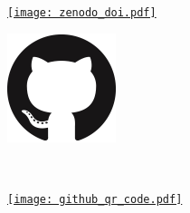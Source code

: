 \documentclass[princeton,portrait]{a0poster}
\newcommand\crule[3][black]{\textcolor{#1}{\rule{#2}{#3}}}
\begin{document}
\begin{minipage}[b]{\linewidth}
\begin{minipage}{0.18\linewidth}
  \vspace{-0.5cm}
  \begin{center}
   \href{https://doi.org/10.5281/zenodo.1169739}{\texttt{[image: zenodo\_doi.pdf]}}
  \end{center}
 \end{minipage}%
 \begin{minipage}{0.18\linewidth}
  \begin{minipage}{0.25\linewidth}
   \begin{flushleft}
    \href{https://github.com/scikit-hep/pyhf}{\includegraphics[width=\linewidth]{GitHub_logo.png}}
   \end{flushleft}
  \end{minipage}%
  \,\!
  \begin{minipage}{0.25\linewidth}
   \begin{flushleft}
    \href{https://github.com/scikit-hep/pyhf}{\texttt{[image: github\_qr\_code.pdf]}}
   \end{flushleft}
  \end{minipage}%
 \end{minipage}%
 \vspace{-1cm}
\end{minipage}
\noindent\makebox[\linewidth]{\crule[NSF-blue]{\paperheight}{0.5cm}}

\end{document}
